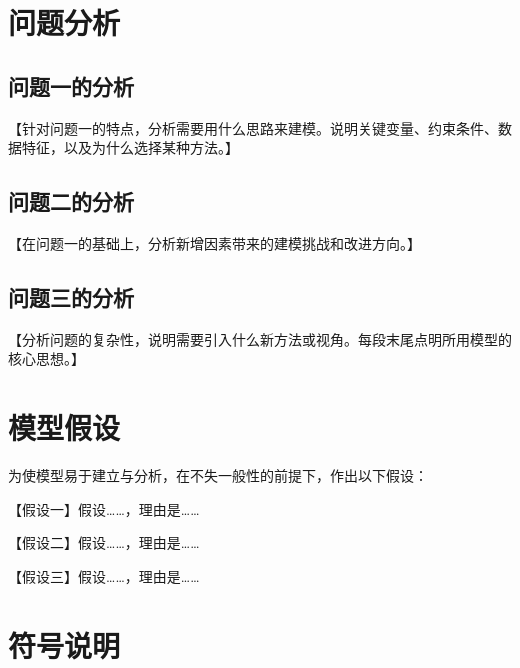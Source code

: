 \documentclass[withoutpreface,bwprint]{cumcmthesis}
\begin{document}
\section{问题分析}

\subsection{问题一的分析}

【针对问题一的特点，分析需要用什么思路来建模。说明关键变量、约束条件、数据特征，以及为什么选择某种方法。】

\subsection{问题二的分析}

【在问题一的基础上，分析新增因素带来的建模挑战和改进方向。】

\subsection{问题三的分析}

【分析问题的复杂性，说明需要引入什么新方法或视角。每段末尾点明所用模型的核心思想。】

\section{模型假设}

为使模型易于建立与分析，在不失一般性的前提下，作出以下假设：

\begin{assumption}
    【假设一】假设……，理由是……
\end{assumption}

\begin{assumption}
    【假设二】假设……，理由是……
\end{assumption}

\begin{assumption}
    【假设三】假设……，理由是……
\end{assumption}

\section{符号说明}
\end{document}
